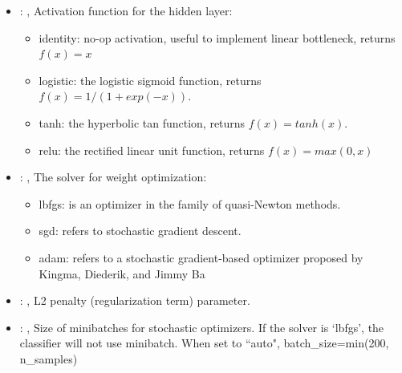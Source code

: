 \begin{itemize}
    \item {}: ,
      Activation function for the hidden layer:
      \begin{itemize}                                                   \item identity:  no-op
      activation, useful to implement linear bottleneck, returns $f(x) = x$
      \item logistic: the logistic sigmoid function, returns $f(x) = 1 / (1 + exp(-x))$.
      \item tanh: the hyperbolic tan function, returns $f(x) = tanh(x)$.
      \item relu:  the rectified linear unit function, returns $f(x) = max(0, x)$
      \end{itemize}

    \item {}: ,
      The solver for weight optimization:
      \begin{itemize}                                                   \item lbfgs: is an optimizer
      in the family of quasi-Newton methods.                                                   \item
      sgd: refers to stochastic gradient descent.
      \item adam: refers to a stochastic gradient-based optimizer proposed by Kingma, Diederik, and
      Jimmy Ba                                                  \end{itemize}

    \item {}: ,
      L2 penalty (regularization term) parameter.

    \item {}: ,
      Size of minibatches for stochastic optimizers. If the solver is `lbfgs',
      the classifier will not use minibatch. When set to ``auto", batch\_size=min(200, n\_samples)


\end{itemize}

